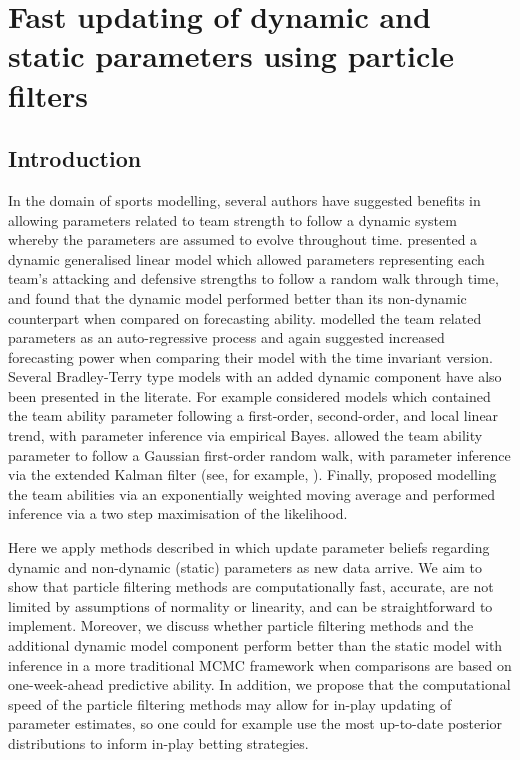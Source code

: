 
\singlespacing

\chapter{Fast updating of dynamic and static parameters using particle filters}
\label{ch:Fast_updating_of_dynamic_and_static_parameters_using_particle_filters}

\onehalfspacing

\section{Introduction} 

In the domain of sports modelling, several authors have suggested benefits in allowing parameters related to team
strength to follow a dynamic system whereby the parameters are assumed to evolve throughout time. \cite{Owen2011}
presented a dynamic generalised linear model which allowed parameters representing each team's attacking and defensive
strengths to follow a random walk through time, and found that the dynamic model performed better than its non-dynamic
counterpart when compared on forecasting ability. \cite{koopman2015} modelled the team related parameters as an
auto-regressive process and again suggested increased forecasting power when comparing their model with the time
invariant version. Several Bradley-Terry type models with an added dynamic component have also been presented in the
literate. For example \cite{FahrmeirTutz1994} considered models which contained the team ability parameter following a
first-order, second-order, and local linear trend, with parameter inference via empirical Bayes. \cite{KnorrHeld2000}
allowed the team ability parameter to follow a Gaussian first-order random walk, with parameter inference via the
extended Kalman filter (see, for example, \cite{einicke2012}). Finally, \cite{CattelanVarinFirth2013} proposed modelling
the team abilities via an exponentially weighted moving average and performed inference via a two step maximisation of
the likelihood.
 
Here we apply methods described in \cite{liu2001} which update parameter beliefs regarding dynamic and non-dynamic
(static) parameters as new data arrive. We aim to show that particle filtering methods are computationally fast,
accurate, are not limited by assumptions of normality or linearity, and can be straightforward to implement. Moreover,
we discuss whether particle filtering methods and the additional dynamic model component perform better than the static
model with inference in a more traditional \gls{MCMC} framework when comparisons are based on one-week-ahead predictive
ability. In addition, we propose that the computational speed of the particle filtering methods may allow for in-play
updating of parameter estimates, so one could for example use the most up-to-date posterior distributions to inform
in-play betting strategies.


